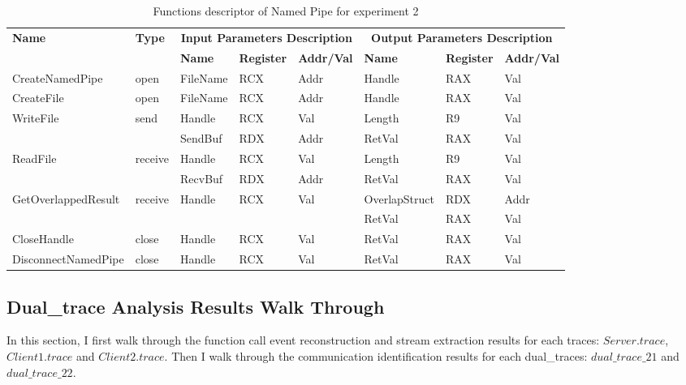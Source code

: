 \begin{table}[H]
  \centering
  \caption{Functions descriptor of Named Pipe for experiment 2}
  \label{fdescexp2}
\begin{tabular}{|l|l|l|l|l|l|l|l|}
\hline
             \multirow{2}{*}{{\textbf{Name}}} & \multirow{2}{*}{{\textbf{Type}}} & \multicolumn{3}{c|}{\textbf{Input Parameters Description}} & \multicolumn{3}{c|}{\textbf{Output Parameters Description}} \\
              \cline{3-8} 
             & & \textbf{Name}& \textbf{Register} & \textbf{Addr/Val} & \textbf{Name}& \textbf{Register} &  \textbf{Addr/Val}  \\
             \hline
      CreateNamedPipe
       &open & FileName & RCX  & Addr &  Handle & RAX & Val\\
      \hline         
      CreateFile
       &open & FileName & RCX & Addr&  Handle & RAX & Val\\ 
      \hline              
      \multirow{2}{*}{WriteFile}
       &\multirow{2}{*}{send} &  Handle & RCX & Val & Length & R9 & Val\\
        \cline{3-8} 
       & & SendBuf & RDX & Addr & RetVal& RAX & Val\\
      \hline            
      \multirow{2}{*}{ReadFile}
       &\multirow{2}{*}{receive} &  Handle & RCX & Val& Length & R9 & Val\\
        \cline{3-8} 
       & & RecvBuf & RDX  & Addr & RetVal& RAX & Val\\
      \hline    
           \multirow{2}{*}{GetOverlappedResult} &
       \multirow{2}{*}{receive} &  \multirow{2}{*}{Handle} & \multirow{2}{*}{RCX} & \multirow{2}{*}{Val} &OverlapStruct &RDX & Addr\\
               \cline{6-8} 
       & &  &   &  & RetVal& RAX & Val\\
      \hline     
      CloseHandle &
       close &  Handle & RCX & Val & RetVal& RAX & Val\\
      \hline            
      DisconnectNamedPipe &
      close &  Handle & RCX & Val & RetVal& RAX & Val\\
      \hline               
  \end{tabular}  
\end{table} 

\subsection{Dual\_trace Analysis Results Walk Through}
In this section, I first walk through the function call event reconstruction and stream extraction results for each traces: $Server.trace$, $Client1.trace$ and $Client2.trace$. Then I walk through the communication identification results for each dual\_traces: $dual\_trace\_21$ and $dual\_trace\_22$.

